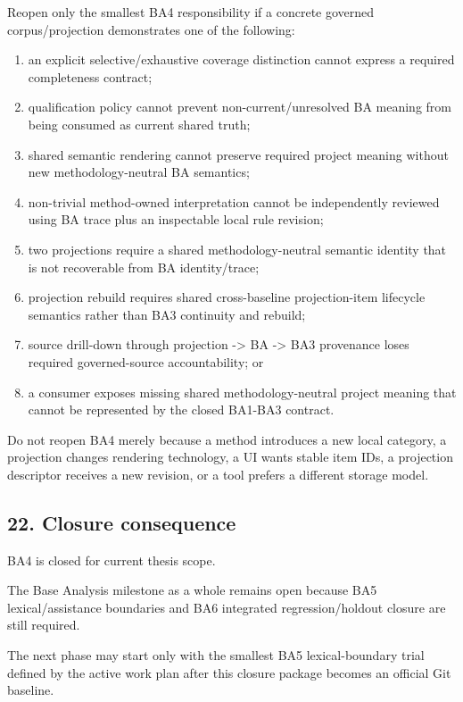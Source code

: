 \documentclass[
  11pt,
  a4paper,
]{article}
\providecommand{\tightlist}{%
  \setlength{\itemsep}{0pt}\setlength{\parskip}{0pt}}
\begin{document}
Reopen only the smallest BA4 responsibility if a concrete governed
corpus/projection demonstrates one of the following:

\begin{enumerate}
\def\labelenumi{\arabic{enumi}.}
\tightlist
\item
  an explicit selective/exhaustive coverage distinction cannot express a
  required completeness contract;
\item
  qualification policy cannot prevent non-current/unresolved BA meaning
  from being consumed as current shared truth;
\item
  shared semantic rendering cannot preserve required project meaning
  without new methodology-neutral BA semantics;
\item
  non-trivial method-owned interpretation cannot be independently
  reviewed using BA trace plus an inspectable local rule revision;
\item
  two projections require a shared methodology-neutral semantic identity
  that is not recoverable from BA identity/trace;
\item
  projection rebuild requires shared cross-baseline projection-item
  lifecycle semantics rather than BA3 continuity and rebuild;
\item
  source drill-down through projection -\textgreater{} BA
  -\textgreater{} BA3 provenance loses required governed-source
  accountability; or
\item
  a consumer exposes missing shared methodology-neutral project meaning
  that cannot be represented by the closed BA1-BA3 contract.
\end{enumerate}

Do not reopen BA4 merely because a method introduces a new local
category, a projection changes rendering technology, a UI wants stable
item IDs, a projection descriptor receives a new revision, or a tool
prefers a different storage model.

\subsection{22. Closure consequence}\label{closure-consequence}

BA4 is closed for current thesis scope.

The Base Analysis milestone as a whole remains open because BA5
lexical/assistance boundaries and BA6 integrated regression/holdout
closure are still required.

The next phase may start only with the smallest BA5 lexical-boundary
trial defined by the active work plan after this closure package becomes
an official Git baseline.
\end{document}
